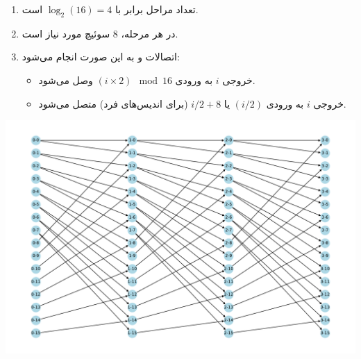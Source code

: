 \begin{itemize}
\begin{qsolve}
		\begin{enumerate}
			\item تعداد مراحل برابر با \(\log_2(16) = 4\) است.
			\item در هر مرحله، \(8\) سوئیچ  مورد نیاز است.
			\item اتصالات  و  به این صورت انجام می‌شود:
			\begin{itemize}
				\item {} خروجی \(i\) به ورودی \((i \times 2) \mod 16\) وصل می‌شود.
				\item {} خروجی \(i\) به ورودی \((i / 2)\) یا \(i / 2 + 8\) (برای اندیس‌های فرد) متصل می‌شود.
			\end{itemize}
		\end{enumerate}
	\end{qsolve}
\end{itemize}
\newpage


\begin{center}
	\includegraphics*[width=1\linewidth]{pics/img24.pdf}
\end{center}
